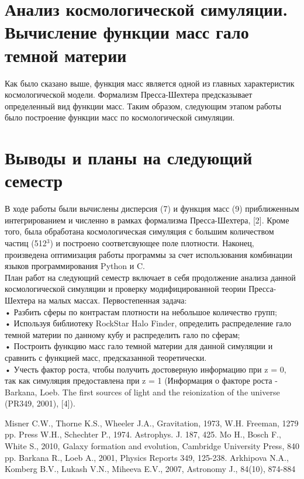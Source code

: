 \documentclass[11pt]{article}
\begin{document}
\section{Анализ космологической симуляции. Вычисление функции масс гало темной материи}
Как было сказано выше, функция масс является одной из главных характеристик космологической модели. Формализм Пресса-Шехтера предсказывает определенный вид функции масс. Таким образом, следующим этапом работы было построение функции масс по космологической симуляции. 
\section{Выводы и планы на следующий семестр}
В ходе работы были вычислены дисперсия (7) и функция масс (9) приближенным интегрированием и численно в рамках формализма Пресса-Шехтера, [2]. Кроме того, была обработана космологическая симуляция с большим количеством частиц (512$^3$) и построено соответсвующее поле плотности. Наконец, произведена оптимизация работы программы за счет использования комбинации языков программирования Python и C.\\
План работ на следующий семестр включает в себя продолжение анализа данной космологической симуляции и проверку модифицированной теории Пресса-Шехтера на малых массах. Первостепенная задача:\\
•	Разбить сферы по контрастам плотности на небольшое количество групп;\\
•	Используя библиотеку RockStar Halo Finder, определить распределение гало темной материи по данному кубу и распределить гало по сферам;\\
•	Построить функцию масс гало темной материи для данной симуляции и сравнить с функцией масс, предсказанной теоретически.\\
•	Учесть фактор роста, чтобы получить достоверную информацию при z = 0, так как симуляция предоставлена при z = 1 (Информация о факторе роста - Barkana, Loeb. The first sources of light and the reionization of the universe (PR349, 2001), [4]).

\begin{thebibliography}{9}
Misner C.W., Thorne K.S., Wheeler J.A., Gravitation, 1973, W.H. Freeman, 1279 pp.
Press W.H., Schechter P., 1974. Astrophys. J. 187, 425.
Mo H., Bosch F., White S., 2010, Galaxy formation and evolution,  Cambridge University Press, 840 pp.
Barkana R., Loeb A., 2001, Physics Reports 349, 125-238.
Arkhipova N.A., Komberg B.V., Lukash V.N., Miheeva E.V., 2007, Astronomy J., 84(10), 874-884
\end{thebibliography}
\end{document}
